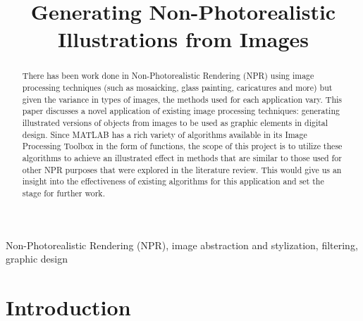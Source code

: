 \documentclass{article}
\title{Generating Non-Photorealistic Illustrations from Images}
\begin{document}
%

\maketitle
%
\begin{abstract}
There has been work done in Non-Photorealistic Rendering (NPR) using image processing techniques (such as mosaicking, glass painting, caricatures and more) but given the variance in types of images, the methods used for each application vary. This paper discusses a novel application of existing image processing techniques: generating illustrated versions of objects from images to be used as graphic elements in digital design. Since MATLAB has a rich variety of algorithms available in its Image Processing Toolbox in the form of functions, the scope of this project is to utilize these algorithms to achieve an illustrated effect in methods that are similar to those used for other NPR purposes that were explored in the literature review. This would give us an insight into the effectiveness of existing algorithms for this application and set the stage for further work.  
\end{abstract}
%
\begin{keywords}
Non-Photorealistic Rendering (NPR), image abstraction and stylization, filtering, graphic design
\end{keywords}
%
\section{Introduction}
\label{sec:intro}
\end{document}
